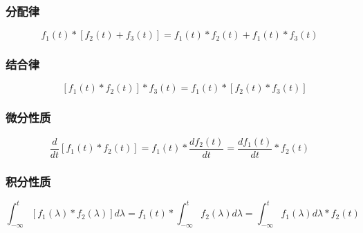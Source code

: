 \documentclass[UTF8]{article}
\theoremstyle{definition}
\begin{document}
\subsubsection{分配律}
\begin{equation*}
f_1(t) *\left[f_2(t)+f_3(t)\right]=f_1(t) * f_2(t)+f_1(t) * f_3(t)
\end{equation*}


\subsubsection{结合律}
\begin{equation*}
\quad\left[f_1(t) * f_2(t)\right] * f_3(t)=f_1(t) *\left[f_2(t) * f_3(t)\right]
\end{equation*}
 

\subsubsection{微分性质}
\begin{equation*}
\frac{d}{d t}\left[f_1(t) * f_2(t)\right]=f_1(t) * \frac{d f_2(t)}{d t}=\frac{d f_1(t)}{d t} * f_2(t)
\end{equation*}

\subsubsection{积分性质}
\begin{equation*}
\int_{-\infty}^t\left[f_1(\lambda) * f_2(\lambda)\right] d \lambda=f_1(t) * \int_{-\infty}^t f_2(\lambda) d \lambda=\int_{-\infty}^t f_1(\lambda) d \lambda * f_2(t)
\end{equation*}
\end{document}
